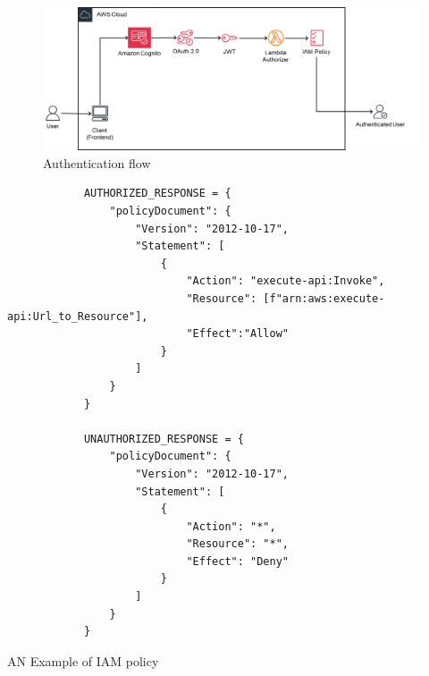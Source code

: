 \begin{figure}[!ht]
    \centering
    \includegraphics[width=1 \textwidth]{chapters/images/Methods/Deployment/Authentication_flow.png}
    \caption{Authentication flow}
    \label{fig:Authenticationflow}
\end{figure}

\begin{listing}[!ht]

        \begin{verbatim}
            AUTHORIZED_RESPONSE = {
                "policyDocument": {
                    "Version": "2012-10-17",
                    "Statement": [
                        {
                            "Action": "execute-api:Invoke",
                            "Resource": [f"arn:aws:execute-api:Url_to_Resource"],
                            "Effect":"Allow"
                        }
                    ]
                }
            }

            UNAUTHORIZED_RESPONSE = {
                "policyDocument": {
                    "Version": "2012-10-17",
                    "Statement": [
                        {
                            "Action": "*",
                            "Resource": "*",
                            "Effect": "Deny"
                        }
                    ]
                }
            }
        \end{verbatim}
    
    \caption{AN Example of IAM policy}
    \label{Listing:2}   
\end{listing}


